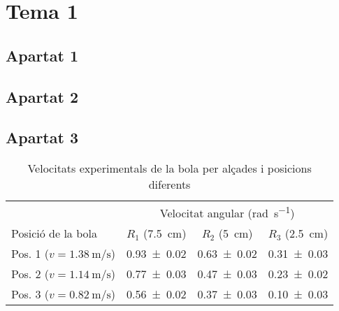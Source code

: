 \section{Tema 1}
\subsection{Apartat 1}

\subsection{Apartat 2}

\subsection{Apartat 3}

\begin{table}[H]
	\centering
	\begin{tabular}{l c c c}
		\toprule
		\toprule
		& \multicolumn{3}{c}{Velocitat angular (\si{\radian\per\s})} \\
		\cmidrule(l){2-4}
		Posició de la bola & $R_{1}$ (\SI{7.5}{\cm}) & $R_{2}$ (\SI{5}{\cm}) & $R_{3}$ (\SI{2.5}{\cm}) \\
		\midrule
		Pos. 1 ($v = \SI{1.38}{\m\per\s}$) & \num{0.93 \pm 0.02} & \num{0.63 \pm 0.02} & \num{0.31 \pm 0.03} \\
		Pos. 2 ($v = \SI{1.14}{\m\per\s}$) & \num{0.77 \pm 0.03} & \num{0.47 \pm 0.03} & \num{0.23 \pm 0.02} \\
		Pos. 3 ($v = \SI{0.82}{\m\per\s}$) & \num{0.56 \pm 0.02} & \num{0.37 \pm 0.03} & \num{0.10 \pm 0.03} \\
		\bottomrule
	\end{tabular}
	\caption{Velocitats experimentals de la bola per alçades i posicions diferents}
	\label{tab:vel-bola-exp}
\end{table}

